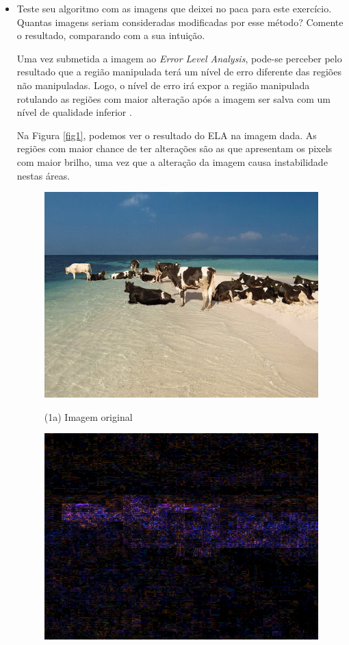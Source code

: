 \documentclass[12pt]{article}
\begin{document}
\begin{itemize}
\begin{itemize}
\item Teste seu algoritmo com as imagens que deixei no paca para este exercício. 
Quantas imagens seriam consideradas modificadas por esse método? Comente o resultado,
comparando com a sua intuição.

Uma vez submetida a imagem ao \textit{Error Level Analysis}, pode-se perceber pelo resultado que 
a região manipulada terá um nível de erro diferente das regiões não manipuladas. Logo, 
o nível de erro irá expor a região manipulada rotulando as regiões com maior alteração após
a imagem ser salva com um nível de qualidade inferior \cite{krawetz}.

Na Figura \ref{fig1}, podemos ver o resultado do ELA na imagem dada. As regiões com maior chance de ter
alterações são as que apresentam os pixels com maior brilho, uma vez que a alteração da imagem 
causa instabilidade nestas áreas.
\begin{figure}[H]
\centering
\begin{minipage}[b]{0.45\textwidth}
	\centering
        \includegraphics[scale=0.3]{Q3Images/cows_on_beach.jpg}
	\centerline{\small (1a) Imagem original}
\end{minipage}
\begin{minipage}[b]{0.45\textwidth}
	\centering
        \includegraphics[scale=0.3]{Q3Images/cows_on_beach_ela.jpg} 

\end{minipage}
\end{figure}
\end{itemize}
\end{itemize}
\end{document}

